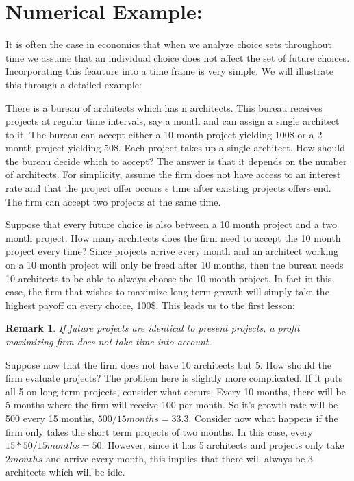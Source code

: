 \documentclass[12pt]{report}
\newtheorem{remark}{Remark}
\numberwithin{equation}{section}
\begin{document}
\section{Numerical Example:}

It is often the case in economics that when we analyze choice sets throughout time we assume that an individual choice does not affect the set of future choices. Incorporating this feauture into a time frame is very simple. We will illustrate this through a detailed example: 

There is a bureau of architects which has n architects. This bureau receives projects at regular time intervals, say a month and can assign a single architect to it. The bureau can accept either a 10 month project yielding 100\$ or a 2 month project yielding 50\$. Each project takes up a single architect. How should the bureau decide which to accept? The answer is that it depends on the number of architects. For simplicity, assume the firm does not have access to an interest rate and that the project offer occurs $\epsilon$ time after existing projects offers end. The firm can accept two projects at the same time. 

Suppose that every future choice is also between a 10 month project and a two month project. How many architects does the firm need to accept the 10 month project every time? Since projects arrive every month and an architect working on a 10 month project will only be freed after 10 months, then the bureau needs 10 architects to be able to always choose the 10 month project. In fact in this case, the firm that wishes to maximize long term growth will simply take the highest payoff on every choice, 100\$. This leads us to the first lesson:

\begin{remark}
If future projects are identical to present projects, a profit maximizing firm does not take time into account. 
\end{remark}

Suppose now that the firm does not have 10 architects but 5. How should the firm evaluate projects? The problem here is slightly more complicated. If it puts all 5 on long term projects, consider what occurs. Every 10 months, there will be 5 months where the firm will receive 100 per month. So it's growth rate will be 500 every 15 months, $500/15months=33.3$. Consider now what happens if the firm only takes the short term projects of two months. In this case, every $15*50/15 months=50$. However, since it has 5 architects and projects only take $2 months$ and arrive every month, this implies that there will always be 3 architects which will be idle. 
\end{document}
